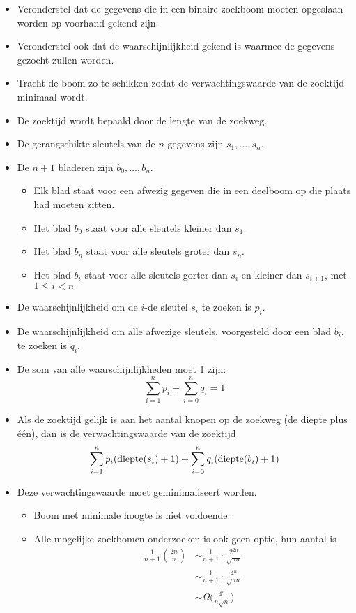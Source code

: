 \begin{itemize}
    \item Veronderstel dat de gegevens die in een binaire zoekboom moeten opgeslaan worden op voorhand gekend zijn.
    \item Veronderstel ook dat de waarschijnlijkheid gekend is waarmee de gegevens gezocht zullen worden.
    \item Tracht de boom zo te schikken zodat de verwachtingswaarde van de zoektijd minimaal wordt.
    \item De zoektijd wordt bepaald door de lengte van de zoekweg.
    \item De gerangschikte sleutels van de $n$ gegevens zijn $s_1, \dots, s_n$.
    \item De $n + 1$ bladeren zijn $b_0, \dots, b_n$.
    \begin{itemize}
        \item Elk blad staat voor een afwezig gegeven die in een deelboom op die plaats had moeten zitten.
        \item Het blad $b_0$ staat voor alle sleutels kleiner dan $s_1$.
        \item Het blad $b_n$ staat voor alle sleutels groter dan $s_n$.
        \item Het blad $b_i$ staat voor alle sleutels gorter dan $s_i$ en kleiner dan $s_{i +1}$, met $1 \leq i < n$
    \end{itemize}
    \item De waarschijnlijkheid om de $i$-de sleutel $s_i$ te zoeken is $p_i$. 
    \item De waarschijnlijkheid om alle afwezige sleutels, voorgesteld door een blad $b_i$, te zoeken is $q_i$.
    \item De som van alle waarschijnlijkheden moet 1 zijn:
    $$\sum_{i = 1}^n p_i + \sum_{i = 0}^n q_i = 1$$
    \item Als de zoektijd gelijk is aan het aantal knopen op de zoekweg (de diepte plus één), dan is de verwachtingswaarde van de zoektijd
    $$\sum_{i = 1}^n p_i (\hbox{diepte}(s_i) + 1) + \sum_{i = 0}^n q_i (\hbox{diepte}(b_i) + 1)$$
    \item Deze verwachtingswaarde moet geminimaliseert worden.
    \begin{itemize}
        \item Boom met minimale hoogte is niet voldoende.
        \item Alle mogelijke zoekbomen onderzoeken is ook geen optie, hun aantal is 
        \begin{align*}
            \frac{1}{n + 1}\binom{2n}{n} & \sim \frac{1}{n + 1} \cdot \frac{2^{2n}}{\sqrt{\pi n}} \\
                                         & \sim \frac{1}{n + 1} \cdot \frac{4^{n}}{\sqrt{\pi n}} \\
                                         & \sim \Omega\bigg(\frac{4^n}{n\sqrt{n}}\bigg)
        \end{align*}
      

\end{itemize}
\end{itemize}
